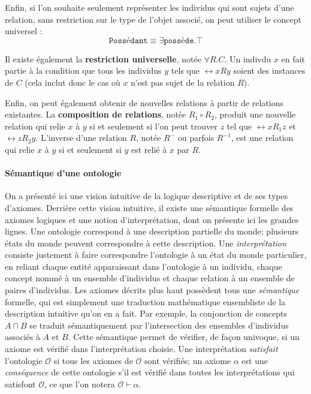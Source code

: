 Enfin, si l'on souhaite seulement représenter les individus qui sont sujets d'une relation, sans restriction sur le type de l'objet associé, on peut utiliser le concept universel :
\begin{equation}
    \texttt{Possédant} \equiv \exists \texttt{possède}.\top
\end{equation}

Il existe également la \textbf{restriction universelle}, notée $\forall R.C$. Un indivdu $x$ en fait partie à la condition que tous les individus $y$ tels que $\rel{x}{R}{y}$ %
soient des instances de $C$ (cela inclut donc le cas où $x$ n'est pas sujet de la relation $R$).

Enfin, on peut également obtenir de nouvelles relations à partir de relations existantes. La \textbf{composition de relations}, notée $R_1 \circ R_2$, produit une nouvelle relation qui relie $x$ à $y$ si et seulement si l'on peut trouver $z$ tel que $\rel{x}{R_1}{z}$ et $\rel{z}{R_2}{y}$. L'inverse d'une relation $R$, notée $R^-$ ou parfois $R^{-1}$, est une relation qui relie $x$ à $y$ si et seulement si $y$ est relié à $x$ par $R$.


\paragraph{Sémantique d'une ontologie}


On a présenté ici une vision intuitive de la logique descriptive et de ses types d'axiomes. Derrière cette vision intuitive, il existe une sémantique formelle des axiomes logiques et une notion d'interprétation, dont on présente ici les grandes lignes.
Une ontologie correspond à une description partielle du monde; plusieurs états du monde peuvent correspondre à cette description. Une \textit{interprétation} consiste justement à faire correspondre l'ontologie à un état du monde particulier, en reliant chaque entité apparaissant dans l'ontologie à un individu, chaque concept nommé à un ensemble d'individus et chaque relation à un ensemble de paires d'individus. Les axiomes décrits plus haut possèdent tous une \textit{sémantique} formelle, qui est simplement une traduction mathématique ensembliste de la description intuitive qu'on en a fait. Par exemple, la conjonction de concepts $A \sqcap B$ se traduit sémantiquement par l'intersection des ensembles d'individus associés à $A$ et $B$. Cette sémantique permet de vérifier, de façon univoque, si un axiome est vérifié dans l'interprétation choisie. Une interprétation \textit{satisfait} l'ontologie $\mathcal{O}$ si tous les axiomes de $\mathcal{O}$ sont vérifiés; un axiome $\alpha$ est une \textit{conséquence} de cette ontologie s'il est vérifié dans toutes les interprétations qui satisfont $\mathcal{O}$, ce que l'on notera $\mathcal{O} \vdash \alpha$.

